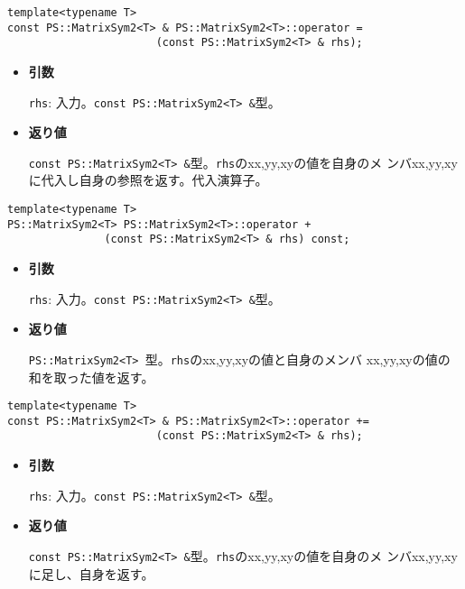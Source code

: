 \begin{screen}
\begin{verbatim}
template<typename T>
const PS::MatrixSym2<T> & PS::MatrixSym2<T>::operator = 
                       (const PS::MatrixSym2<T> & rhs);
\end{verbatim}
\end{screen}

\begin{itemize}

\item{{\bf 引数}}

{\tt rhs}: 入力。{\tt const PS::MatrixSym2<T> \&}型。

\item{{\bf 返り値}}

{\tt const PS::MatrixSym2<T> \&}型。{\tt rhs}のxx,yy,xyの値を自身のメ
ンバxx,yy,xyに代入し自身の参照を返す。代入演算子。

\end{itemize}


\begin{screen}
\begin{verbatim}
template<typename T>
PS::MatrixSym2<T> PS::MatrixSym2<T>::operator + 
               (const PS::MatrixSym2<T> & rhs) const;
\end{verbatim}
\end{screen}

\begin{itemize}

\item{{\bf 引数}}

{\tt rhs}: 入力。{\tt const PS::MatrixSym2<T> \&}型。

\item{{\bf 返り値}}

{\tt PS::MatrixSym2<T> }型。{\tt rhs}のxx,yy,xyの値と自身のメンバ
xx,yy,xyの値の和を取った値を返す。

\end{itemize}

\begin{screen}
\begin{verbatim}
template<typename T>
const PS::MatrixSym2<T> & PS::MatrixSym2<T>::operator += 
                       (const PS::MatrixSym2<T> & rhs);
\end{verbatim}
\end{screen}

\begin{itemize}

\item{{\bf 引数}}

{\tt rhs}: 入力。{\tt const PS::MatrixSym2<T> \&}型。

\item{{\bf 返り値}}

{\tt const PS::MatrixSym2<T> \&}型。{\tt rhs}のxx,yy,xyの値を自身のメ
ンバxx,yy,xyに足し、自身を返す。

\end{itemize}

